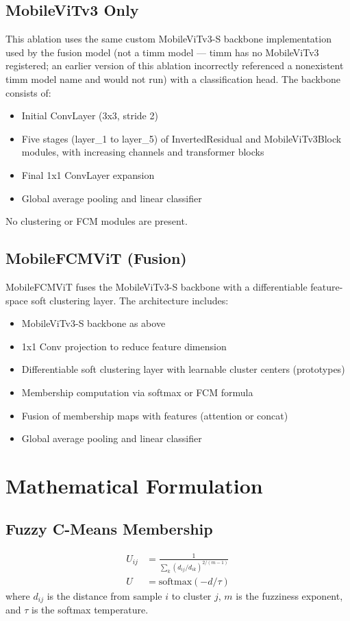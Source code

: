 \subsection{MobileViTv3 Only}
This ablation uses the same custom MobileViTv3-S backbone implementation used by the fusion model (not a timm model — timm has no MobileViTv3 registered; an earlier version of this ablation incorrectly referenced a nonexistent timm model name and would not run) with a classification head. The backbone consists of:
\begin{itemize}
  \item Initial ConvLayer (3x3, stride 2)
  \item Five stages (layer\_1 to layer\_5) of InvertedResidual and MobileViTv3Block modules, with increasing channels and transformer blocks
  \item Final 1x1 ConvLayer expansion
  \item Global average pooling and linear classifier
\end{itemize}
No clustering or FCM modules are present.

\subsection{MobileFCMViT (Fusion)}
MobileFCMViT fuses the MobileViTv3-S backbone with a differentiable feature-space soft clustering layer. The architecture includes:
\begin{itemize}
  \item MobileViTv3-S backbone as above
  \item 1x1 Conv projection to reduce feature dimension
  \item Differentiable soft clustering layer with learnable cluster centers (prototypes)
  \item Membership computation via softmax or FCM formula
  \item Fusion of membership maps with features (attention or concat)
  \item Global average pooling and linear classifier
\end{itemize}

\section{Mathematical Formulation}
\subsection{Fuzzy C-Means Membership}
\begin{align*}
U_{ij} &= \frac{1}{\sum_k (d_{ij}/d_{ik})^{2/(m-1)}} \\
U &= \text{softmax}(-d/\tau)
\end{align*}
where $d_{ij}$ is the distance from sample $i$ to cluster $j$, $m$ is the fuzziness exponent, and $\tau$ is the softmax temperature.

